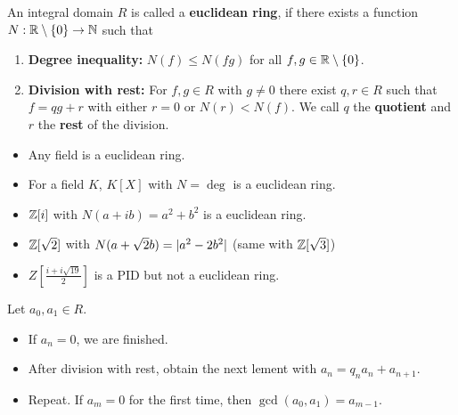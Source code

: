 \begin{dfn}[]
An integral domain $R$ is called a \textbf{euclidean ring}, if there exists a function $N: \mathbb{R} \setminus \{0\} \to  \mathbb{N}$ such that
\begin{enumerate}
  \item \textbf{Degree inequality:} $N(f) \leq N(fg)$ for all $f,g \in \mathbb{R} \setminus \{0\}$.
  \item \textbf{Division with rest:} For $f,g \in R$ with $g \neq 0$ there exist $q,r \in R$ such that $f = q g + r$ with either $r = 0$ or $N(r) < N(f)$.
  We call $q$ the \textbf{quotient} and $r$ the \textbf{rest} of the division.
\end{enumerate}
\end{dfn}

\begin{itemize}
  \item Any field is a euclidean ring.
  \item For a field $K$, $K[X]$ with $N = \deg$ is a euclidean ring.
  \item $\mathbb{Z}[i]$ with $N(a+ib) = a^{2} + b^{2}$ is a euclidean ring.
  \item $\mathbb{Z}[\sqrt{2}]$ with $N(a + \sqrt{2}b) = \vert a^{2} - 2 b^{2}\vert$ (same with $\mathbb{Z}[\sqrt{3}]$)
  \item $Z[\frac{i + i \sqrt{19}}{2}]$ is a PID but not a euclidean ring.
\end{itemize}


\begin{thm}
  Let $a_0,a_1 \in R$.
  
  \begin{itemize}
    \item If $a_n = 0$, we are finished.
    \item After division with rest, obtain the next lement with $a_n = q_n a_n + a_{n+1}$.
    \item Repeat. If $a_m = 0$ for the first time, then $\gcd(a_0,a_1) = a_{m-1}$.
  \end{itemize}
\end{thm}

